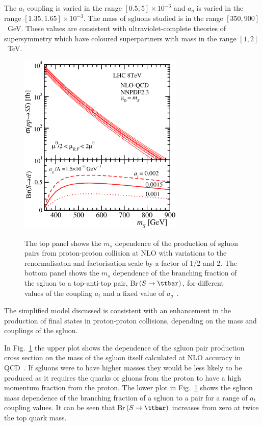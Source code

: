 The $a_t$ coupling is varied in the range $[0.5,5]\times 10^{-3}$ and $a_g$ is varied in the range $[1.35, 1.65] \times 10^{-3}$. The mass of sgluons studied is in the range $[350,900]$~GeV. These values are consistent with ultraviolet-complete theories of supersymmetry which have coloured superpartners with mass in the range $[1,2]$~TeV.
\begin{figure}[h!]
\centering
    \includegraphics[width=0.7\textwidth]{images/Pheno/xsec.pdf}\\
    \caption{The top panel shows the $m_s$ dependence of the production of sgluon pairs from proton-proton collision at NLO with variations to the renormalisaton and factorisation scale by a factor of 1/2 and 2. The bottom panel shows the $m_s$ dependence of the branching fraction of the sgluon to a top-anti-top pair, Br$(S\rightarrow\ttbar)$, for different values of the coupling $a_t$ and a fixed value of $a_g$~\cite{Beck201548}.}
    \label{fig:sgluonxsec}
\end{figure}

The simplified model discussed is consistent with an enhancement in the production of \tttt final states in proton-proton collisions, depending on the mass and couplings of the sgluon.

In Fig.~\ref{fig:sgluonxsec} the upper plot shows the dependence of the sgluon pair production cross section on the mass of the sgluon itself calculated at NLO accuracy in QCD~\cite{GoncalvesNetto:2012nt,Degrande:2014sta}. If sgluons were to have higher masses they would be less likely to be produced as it requires the quarks or gluons from the proton to have a high momentum fraction from the proton. The lower plot in Fig.~\ref{fig:sgluonxsec} shows the sgluon mass dependence of the branching fraction of a sgluon to a \ttbar pair for a range of $a_t$ coupling values. It can be seen that Br$(S\rightarrow\ttbar)$ increases from zero at twice the top quark mass.


